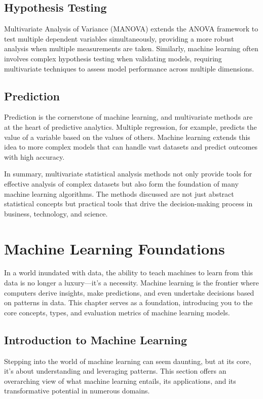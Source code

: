 \documentclass[a4paper,12pt]{book}
\newcounter{example}
\begin{document}
\section{Hypothesis Testing}
Multivariate Analysis of Variance (MANOVA) extends the ANOVA framework to test multiple dependent variables simultaneously, providing a more robust analysis when multiple measurements are taken. Similarly, machine learning often involves complex hypothesis testing when validating models, requiring multivariate techniques to assess model performance across multiple dimensions.

\section{Prediction}
Prediction is the cornerstone of machine learning, and multivariate methods are at the heart of predictive analytics. Multiple regression, for example, predicts the value of a variable based on the values of others. Machine learning extends this idea to more complex models that can handle vast datasets and predict outcomes with high accuracy.

In summary, multivariate statistical analysis methods not only provide tools for effective analysis of complex datasets but also form the foundation of many machine learning algorithms. The methods discussed are not just abstract statistical concepts but practical tools that drive the decision-making process in business, technology, and science.


\chapter{Machine Learning Foundations}
In a world inundated with data, the ability to teach machines to learn from this data is no longer a luxury—it's a necessity. Machine learning is the frontier where computers derive insights, make predictions, and even undertake decisions based on patterns in data. This chapter serves as a foundation, introducing you to the core concepts, types, and evaluation metrics of machine learning models.

\section{Introduction to Machine Learning}
Stepping into the world of machine learning can seem daunting, but at its core, it's about understanding and leveraging patterns. This section offers an overarching view of what machine learning entails, its applications, and its transformative potential in numerous domains.
\end{document}
